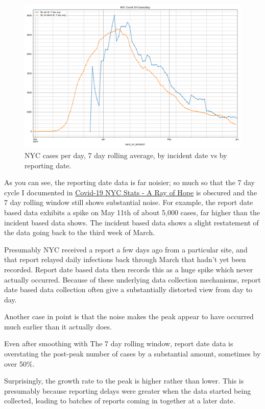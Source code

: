 \documentclass[10pt,reqno]{amsart}
\begin{document}
\begin{figure}[H]
  \centering
  \includegraphics[width=\textwidth]{../Notebooks/casesPerDayHistoryRptDtVsInDt.png}
  \caption{NYC cases per day, 7 day rolling average, by incident date vs by reporting date.}
  \label{fig:rptvsdata7day}
\end{figure}

As you can see, the reporting date data is far noisier; so much so
that the 7 day cycle I documented in
\href{https://hjstein.blogspot.com/2020/04/covid-19-nyc-stats-ray-of-hope.html}{Covid-19
  NYC Stats - A Ray of Hope} is obscured and the 7 day rolling window
still shows substantial noise.  For example, the report date based
data exhibits a spike on May 11th of about 5,000 cases, far higher than
the incident based data shows.  The incident based data shows a slight
restatement of the data going back to the third week of March.

Presumably NYC received a report a few days ago from a particular
site, and that report relayed daily infections back through March that
hadn't yet been recorded.  Report date based data then records this as
a huge spike which never actually occurred.  Because of these
underlying data collection mechanisms, report date based data
collection often give a substantially distorted view from day to day.

Another case in point is that the noise makes the peak appear to have
occurred much earlier than it actually does.

Even after smoothing with The 7 day rolling window, report date data is
overstating the post-peak number of cases by a substantial amount,
sometimes by over 50\%.

Surprisingly, the growth rate to the peak is higher rather than lower.
This is presumably because reporting delays were greater when the data
started being collected, leading to batches of reports coming in
together at a later date.
\end{document}
